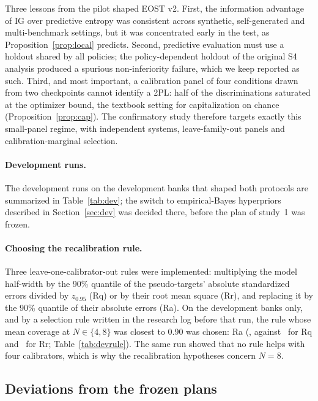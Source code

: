 Three lessons from the pilot shaped EOST v2. First, the information advantage
of IG over predictive entropy was consistent across synthetic, self-generated
and multi-benchmark settings, but it was concentrated early in the test, as
Proposition~\ref{prop:local} predicts. Second, predictive evaluation must use a
holdout shared by all policies; the policy-dependent holdout of the original S4
analysis produced a spurious non-inferiority failure, which we keep reported as
such. Third, and most important, a calibration panel of four conditions drawn
from two checkpoints cannot identify a 2PL: half of the discriminations
saturated at the optimizer bound, the textbook setting for capitalization on
chance (Proposition~\ref{prop:cap}). The confirmatory study therefore targets
exactly this small-panel regime, with independent systems, leave-family-out
panels and calibration-marginal selection.

\paragraph{Development runs.} The development runs on the development banks that shaped both
protocols are summarized in Table~\ref{tab:dev}; the switch to empirical-Bayes hyperpriors
described in Section~\ref{sec:dev} was decided there, before the plan of study~1 was frozen.



\paragraph{Choosing the recalibration rule.} Three leave-one-calibrator-out rules were
implemented: multiplying the model half-width by the 90\% quantile of the pseudo-targets'
absolute standardized errors divided by $z_{0.95}$ (Rq) or by their root mean square
(Rr), and replacing it by the 90\% quantile of their absolute errors (Ra). On the
development banks only, and by a selection rule written in the research log before that
run, the rule whose mean coverage at $N\in\{4,8\}$ was closest to 0.90 was chosen: Ra
(\DevRaCov, against \DevRqCov\ for Rq and \DevRrCov\ for Rr; Table~\ref{tab:devrule}). The same
run showed that no rule helps with four calibrators, which is why the recalibration
hypotheses concern $N=8$.


\subsection{Deviations from the frozen plans}\label{sec:deviations}
\DeviationText

